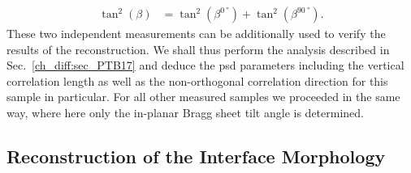 \begin{align}
 \tan^2(\beta) &= \tan^2(\beta^{\SI{0}{\degree}}) + \tan^2(\beta^{\SI{90}{\degree}}) \text{.} \label{ch_diff:eqn_total_beta}
\end{align}
These two independent measurements can be additionally used to verify the results of the reconstruction. We shall thus perform the analysis described in Sec.~\ref{ch_diff:sec_PTB17} and deduce the \gls{psd} parameters including the vertical correlation length as well as the non-orthogonal correlation direction for this sample in particular. For all other measured samples we proceeded in the same way, where here only the in-planar Bragg sheet tilt angle is determined.

\subsection{Reconstruction of the Interface Morphology}
